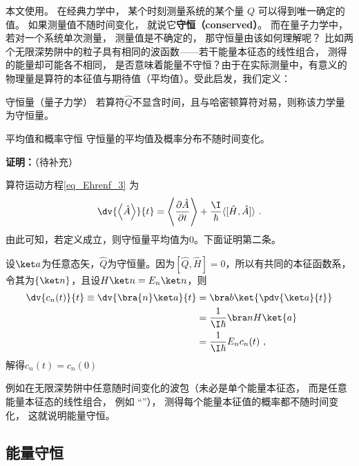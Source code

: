 
本文使用。 在经典力学中， 某个时刻测量系统的某个量 $Q$ 可以得到唯一确定的值。 如果测量值不随时间变化， 就说它\textbf{守恒（conserved）}。 而在量子力学中， 若对一个系统单次测量， 测量值是不确定的， 那守恒量由该如何理解呢？ 比如两个无限深势阱中的粒子具有相同的波函数——若干能量本征态的线性组合， 测得的能量却可能各不相同， 是否意味着能量不守恒？由于在实际测量中，有意义的物理量是算符的本征值与期待值（平均值）。受此启发，我们定义：
\begin{definition}{守恒量（量子力学）}\label{def_QMcons_1}
若算符$\hat Q$不显含时间，且与哈密顿算符对易，则称该力学量为守恒量。
\end{definition}
\begin{corollary}{平均值和概率守恒}
守恒量的平均值及概率分布不随时间变化。
\end{corollary}
\textbf{证明：}（待补充）

算符运动方程\autoref{eq_Ehrenf_3} 为
\begin{equation}\label{eq_Ehrenf_3}
\dv{\left\langle \hat A \right\rangle}{t}=\left\langle\frac{\partial \hat A}{\partial t}\right\rangle+\frac{\I}{\hbar}\langle[\hat H, \hat A]\rangle~.
\end{equation}
由此可知，若定义成立，则守恒量平均值为0。下面证明第二条。

设$\ket a$为任意态矢，$\hat Q$为守恒量。因为$[\hat Q,\hat H]=0$，所以有共同的本征函数系，令其为$\{\ket n\}$，且设$H\ket n=E_n\ket n$，则
\begin{equation}
\begin{aligned}
\dv{c_n(t)}{t}\equiv\dv{\bra{n}\ket a}{t}&=\bra b\ket{\pdv{\ket a}{t}}\\
&=\frac{1}{\I\hbar}\bra n H\ket{a}\\
&=\frac{1}{\I\hbar}E_nc_n(t)~,
\end{aligned}
\end{equation}
解得$c_n(t)=c_n(0)$





例如在无限深势阱中任意随时间变化的波包（未必是单个能量本征态， 而是任意能量本征态的线性组合， 例如 “”）， 测得每个能量本征值的概率都不随时间变化， 这就说明能量守恒。
\subsection{能量守恒}

